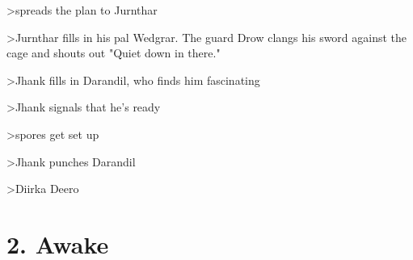 \documentclass[letterpaper,10pt,twoside,twocolumn,openany]{book}
\begin{document}
>spreads the plan to Jurnthar

>Jurnthar fills in his pal Wedgrar. The guard Drow clangs his sword against the cage and shouts out "Quiet down in there."

>Jhank fills in Darandil, who finds him fascinating

>Jhank signals that he's ready 

>spores get set up

>Jhank punches Darandil

>Diirka Deero

\chapter{2. Awake}
\end{document}
